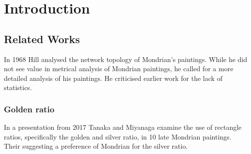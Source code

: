 \section{Introduction}






\subsection{Related Works}


In 1968 Hill \cite{Hill1968} analysed the network topology of Mondrian's paintings.
While he did not see value in metrical analysis of Mondrian paintings, he called
for a more detailed analysis of his paintings. He criticised earlier work for
the lack of statistics.

\subsubsection{Golden ratio}
In a presentation from 2017 Tanaka and
Miyanaga\cite{Tanaka2017} examine the use of rectangle ratios, specifically the
golden and silver ratio, in 10 late Mondrian paintings. Their suggesting a
preference of Mondrian for the silver ratio.


\cite{Livio2002}

